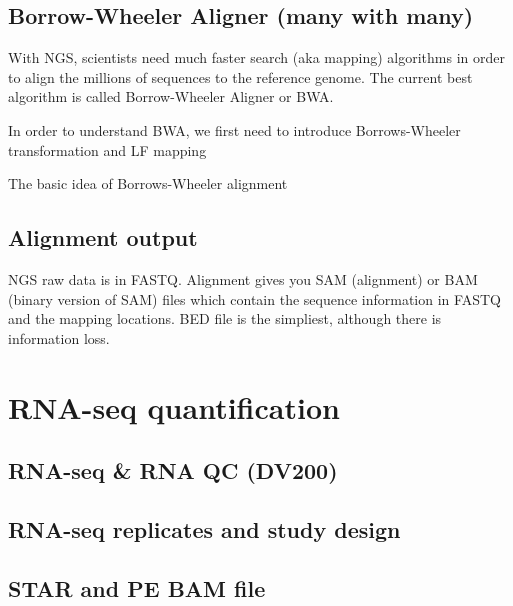 \documentclass[]{book}
\begin{document}
\hypertarget{borrow-wheeler-aligner-many-with-many}{%
\section{Borrow-Wheeler Aligner (many with many)}\label{borrow-wheeler-aligner-many-with-many}}

With NGS, scientists need much faster search (aka mapping) algorithms in order to align the millions of sequences to the reference genome. The current best algorithm is called Borrow-Wheeler Aligner or BWA.

In order to understand BWA, we first need to introduce Borrows-Wheeler transformation and LF mapping

The basic idea of Borrows-Wheeler alignment

\hypertarget{alignment-output}{%
\section{Alignment output}\label{alignment-output}}

NGS raw data is in FASTQ. Alignment gives you SAM (alignment) or BAM (binary version of SAM) files which contain the sequence information in FASTQ and the mapping locations. BED file is the simpliest, although there is information loss.

\hypertarget{rnaseq}{%
\chapter{RNA-seq quantification}\label{rnaseq}}

\hypertarget{rna-seq-rna-qc-dv200}{%
\section{RNA-seq \& RNA QC (DV200)}\label{rna-seq-rna-qc-dv200}}

\hypertarget{rna-seq-replicates-and-study-design}{%
\section{RNA-seq replicates and study design}\label{rna-seq-replicates-and-study-design}}

\hypertarget{star-and-pe-bam-file}{%
\section{STAR and PE BAM file}\label{star-and-pe-bam-file}}
\end{document}
